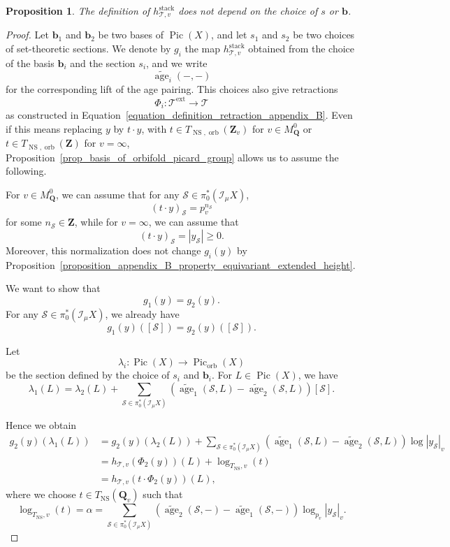 \documentclass{proc-l}
\newcommand{\Z}{\mathbf{Z}}
\newcommand{\Q}{\mathbf{Q}}
\newcommand{\base}{\mathbf{b}}
\DeclareMathOperator{\Pic}{Pic}
\DeclareMathOperator{\stack}{stack}
\DeclareMathOperator{\age}{age}
\DeclareMathOperator{\NS}{NS}
\DeclareMathOperator{\orb}{orb}
\DeclareMathOperator{\ext}{ext}
\newcommand{\stackS}{\mathcal{S}}
\newcommand{\stackT}{\mathcal{T}}
\newcommand{\sheafI}{\mathcal{I}}
\newcommand{\twistsector}{\pi_0^*(\sheafI_{\mu} X)}
\newtheorem{prop}[theorem]{Proposition}
\theoremstyle{definition}
\theoremstyle{remark}
\numberwithin{equation}{section}
\begin{document}
\begin{prop}\label{proposition_extended_height_do_not_depend_on_the_base}
    The definition of $h_{\stackT,v}^{\stack}$ does not depend on the choice of $s$ or $\base$.
\end{prop}

\begin{proof}
Let $\base_1$ and $\base_2$ be two bases of $\Pic(X)$, and let $s_1$ and $s_2$ be two choices of set-theoretic sections. We denote by $g_i$ the map $h_{\stackT,v}^{\stack}$ obtained from the choice of the basis $\base_i$ and the section $s_i$, and we write
$$
\widetilde{\age}_i(-,-)
$$
for the corresponding lift of the age pairing. This choices also give retractions
$$
\Phi_i : \stackT^{\ext} \longrightarrow \stackT
$$
as constructed in Equation~\eqref{equation_definition_retraction_appendix_B}. Even if this means replacing $y$ by $t \cdot y$, with $t \in T_{\NS,\orb}(\Z_v)$ for $v \in M_{\Q}^0$ or $t \in T_{\NS,\orb}(\Z)$ for $v = \infty$, Proposition~\ref{prop_basis_of_orbifold_picard_group} allows us to assume the following.

For $v \in M_{\Q}^0$, we can assume that for any $\stackS \in \twistsector$,
\[
    (t \cdot y)_{\stackS} = p_v^{n_\stackS}
\]for some $n_\stackS \in \Z$, while for $v = \infty$, we can assume that
\[
    (t \cdot y)_{\stackS} = |y_{\stackS}| \geqslant 0.
\]Moreover, this normalization does not change $g_i(y)$ by Proposition~\ref{proposition_appendix_B_property_equivariant_extended_height}.

We want to show that
$$
g_1(y) = g_2(y).
$$
For any $\stackS \in \twistsector$, we already have
$$
g_1(y)([\stackS]) = g_2(y)([\stackS]).
$$

Let
$$
\lambda_i : \Pic(X) \longrightarrow \Pic_{\orb}(X)
$$
be the section defined by the choice of $s_i$ and $\base_i$. For $L \in \Pic(X)$, we have
$$
\lambda_1(L)
=
\lambda_2(L)
+
\sum_{\stackS \in \twistsector}
\left(
\widetilde{\age}_1(\stackS,L)
-
\widetilde{\age}_2(\stackS,L)
\right)
[\stackS].
$$

Hence we obtain
\begin{align*}
g_2(y)(\lambda_1(L))
&=
g_2(y)(\lambda_2(L))
+
\sum_{\stackS \in \twistsector}
\left(
\widetilde{\age}_1(\stackS,L)
-
\widetilde{\age}_2(\stackS,L)
\right)
\log |y_{\stackS}|_v \\
&= h_{\stackT,v}(\Phi_2(y))(L) + \log_{T_{\NS},v}(t) \\
&=
h_{\stackT,v}(t \cdot \Phi_2(y))(L),
\end{align*}
where we choose $t \in T_{\NS}(\Q_v)$ such that
$$
\log_{T_{\NS},v}(t)
=
\alpha
=
\sum_{\stackS \in \twistsector}
\left(
\widetilde{\age}_2(\stackS,-)
-
\widetilde{\age}_1(\stackS,-)
\right)
\log_{p_v} |y_{\stackS}|_v.
$$


\end{proof}
\end{document}

